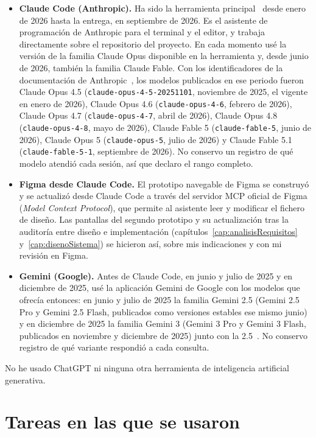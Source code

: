 \begin{itemize}
    \item \textbf{Claude Code (Anthropic).} Ha sido la herramienta principal~\citep{claudecode} desde enero de 2026 hasta la entrega, en septiembre de 2026. Es el asistente de programación de Anthropic para el terminal y el editor, y trabaja directamente sobre el repositorio del proyecto. En cada momento usé la versión de la familia Claude Opus disponible en la herramienta y, desde junio de 2026, también la familia Claude Fable. Con los identificadores de la documentación de Anthropic~\citep{anthropic2026models}, los modelos publicados en ese periodo fueron Claude Opus 4.5 (\texttt{claude-opus-4-5-20251101}, noviembre de 2025, el vigente en enero de 2026), Claude Opus 4.6 (\texttt{claude-opus-4-6}, febrero de 2026), Claude Opus 4.7 (\texttt{claude-opus-4-7}, abril de 2026), Claude Opus 4.8 (\texttt{claude-opus-4-8}, mayo de 2026), Claude Fable 5 (\texttt{claude-fable-5}, junio de 2026), Claude Opus 5 (\texttt{claude-opus-5}, julio de 2026) y Claude Fable 5.1 (\texttt{claude-fable-5-1}, septiembre de 2026). No conservo un registro de qué modelo atendió cada sesión, así que declaro el rango completo.
    \item \textbf{Figma desde Claude Code.} El prototipo navegable de Figma se construyó y se actualizó desde Claude Code a través del servidor MCP oficial de Figma~\citep{figmamcp} (\textit{Model Context Protocol}), que permite al asistente leer y modificar el fichero de diseño. Las pantallas del segundo prototipo y su actualización tras la auditoría entre diseño e implementación (capítulos~\ref{cap:analisisRequisitos} y~\ref{cap:disenoSistema}) se hicieron así, sobre mis indicaciones y con mi revisión en Figma.
    \item \textbf{Gemini (Google).} Antes de Claude Code, en junio y julio de 2025 y en diciembre de 2025, usé la aplicación Gemini de Google con los modelos que ofrecía entonces: en junio y julio de 2025 la familia Gemini 2.5 (Gemini 2.5 Pro y Gemini 2.5 Flash, publicados como versiones estables ese mismo junio) y en diciembre de 2025 la familia Gemini 3 (Gemini 3 Pro y Gemini 3 Flash, publicados en noviembre y diciembre de 2025) junto con la 2.5~\citep{google2026gemini}. No conservo registro de qué variante respondió a cada consulta.
\end{itemize}

No he usado ChatGPT ni ninguna otra herramienta de inteligencia artificial generativa.

\section{Tareas en las que se usaron}
\label{sec:declaracionTareas}

